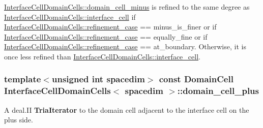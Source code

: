 \hyperlink{class_interface_cell_domain_cells_ae610a6a7b0ff4a421ee051cb873bbc22}{Interface\+Cell\+Domain\+Cells\+::domain\+\_\+cell\+\_\+minus} is refined to the same degree as \hyperlink{class_interface_cell_domain_cells_acabc5a62be3f7742c3c334ae1777fbd5}{Interface\+Cell\+Domain\+Cells\+::interface\+\_\+cell} if \hyperlink{class_interface_cell_domain_cells_ab1b5469ca5c40256942ea179abbba92c}{Interface\+Cell\+Domain\+Cells\+::refinement\+\_\+case} == {\ttfamily minus\+\_\+is\+\_\+finer} or if \hyperlink{class_interface_cell_domain_cells_ab1b5469ca5c40256942ea179abbba92c}{Interface\+Cell\+Domain\+Cells\+::refinement\+\_\+case} == {\ttfamily equally\+\_\+fine} or if \hyperlink{class_interface_cell_domain_cells_ab1b5469ca5c40256942ea179abbba92c}{Interface\+Cell\+Domain\+Cells\+::refinement\+\_\+case} == {\ttfamily at\+\_\+boundary}. Otherwise, it is once less refined than \hyperlink{class_interface_cell_domain_cells_acabc5a62be3f7742c3c334ae1777fbd5}{Interface\+Cell\+Domain\+Cells\+::interface\+\_\+cell}. 
\subsubsection[{\texorpdfstring{domain\+\_\+cell\+\_\+plus}{domain_cell_plus}}]{\setlength{\rightskip}{0pt plus 5cm}template$<$unsigned int spacedim$>$ const {\bf Domain\+Cell} {\bf Interface\+Cell\+Domain\+Cells}$<$ spacedim $>$\+::domain\+\_\+cell\+\_\+plus}\hypertarget{class_interface_cell_domain_cells_a72c7faaed3a84c546d47960f1064f9df}{}\label{class_interface_cell_domain_cells_a72c7faaed3a84c546d47960f1064f9df}
A deal.\+II {\bf Tria\+Iterator} to the domain cell adjacent to the interface cell on the plus side.

